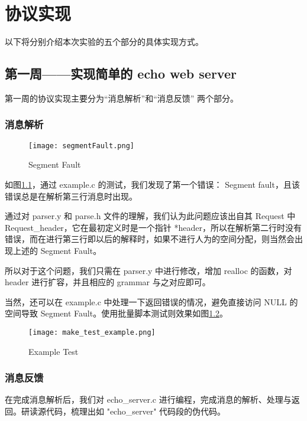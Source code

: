 \chapter{协议实现}

以下将分别介绍本次实验的五个部分的具体实现方式。

\section{第一周——实现简单的 echo web server}

第一周的协议实现主要分为“消息解析”和“消息反馈” 两个部分。

\subsection{消息解析}

\begin{figure}[htbp!]
    \centering
    \texttt{[image: segmentFault.png]}
    \caption{Segment Fault}\label{fig:segmentfault}
    \vspace{-1em}
\end{figure}

如图\ref{fig:segmentfault}，通过 example.c 的测试，我们发现了第一个错误： Segment fault，且该错误总是在解析第三行消息时出现。

通过对 parser.y 和 parse.h 文件的理解，我们认为此问题应该出自其 Request 中 Request\_header，它在最初定义时是一个指针 *header，所以在解析第二行时没有错误，而在进行第三行即以后的解释时，如果不进行人为的空间分配，则当然会出现上述的 Segment Fault。

所以对于这个问题，我们只需在 parser.y 中进行修改，增加 realloc 的函数，对 header 进行扩容，并且相应的 grammar 与之对应即可。

当然，还可以在 example.c 中处理一下返回错误的情况，避免直接访问 NULL 的空间导致 Segment Fault。使用批量脚本测试则效果如图\ref{fig:maketestexample}。

\begin{figure}[htbp!]
    \centering
    \texttt{[image: make\_test\_example.png]}
    \caption{Example Test}\label{fig:maketestexample}
    \vspace{-1em}
\end{figure}

\subsection{消息反馈}

在完成消息解析后，我们对 echo\_server.c 进行编程，完成消息的解析、处理与返回。研读源代码，梳理出如 "echo\_server" 代码段的伪代码。

